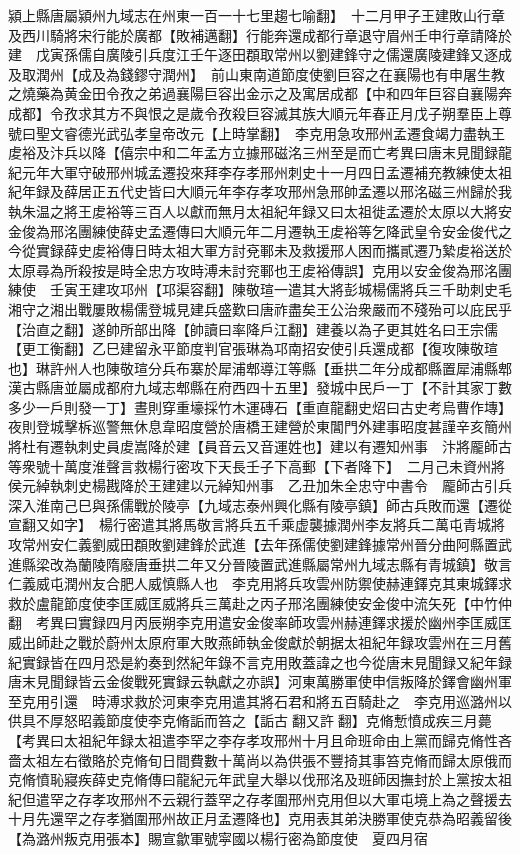潁上縣唐屬潁州九域志在州東一百一十七里趨七喻翻】　十二月甲子王建敗山行章及西川騎將宋行能於廣都【敗補邁翻】行能奔還成都行章退守眉州壬申行章請降於建　戊寅孫儒自廣陵引兵度江壬午逐田頵取常州以劉建鋒守之儒還廣陵建鋒又逐成及取潤州【成及為錢鏐守潤州】　前山東南道節度使劉巨容之在襄陽也有申屠生教之燒藥為黄金田令孜之弟過襄陽巨容出金示之及寓居成都【中和四年巨容自襄陽奔成都】令孜求其方不與恨之是歲令孜殺巨容滅其族大順元年春正月戊子朔羣臣上尊號曰聖文睿德光武弘孝皇帝改元【上時掌翻】　李克用急攻邢州孟遷食竭力盡執王䖍裕及汴兵以降【僖宗中和二年孟方立據邢磁洺三州至是而亡考異曰唐末見聞録龍紀元年大軍守破邢州城孟遷投來拜李存孝邢州刺史十一月四日孟遷補充教練使太祖紀年録及薛居正五代史皆曰大順元年李存孝攻邢州急邢帥孟遷以邢洺磁三州歸於我執朱温之將王䖍裕等三百人以獻而無月太祖紀年録又曰太祖徙孟遷於太原以大將安金俊為邢洺團練使薛史孟遷傳曰大順元年二月遷執王䖍裕等乞降武皇令安金俊代之今從實録薛史䖍裕傳日時太祖大軍方討兗鄆未及救援邢人困而攜貳遷乃縶䖍裕送於太原尋為所殺按是時全忠方攻時溥未討兖鄆也王䖍裕傳誤】克用以安金俊為邢洺團練使　壬寅王建攻邛州【邛渠容翻】陳敬瑄一遣其大將彭城楊儒將兵三千助刺史毛湘守之湘出戰屢敗楊儒登城見建兵盛歎曰唐祚盡矣王公治衆嚴而不殘殆可以庇民乎【治直之翻】遂帥所部出降【帥讀曰率降戶江翻】建養以為子更其姓名曰王宗儒【更工衡翻】乙巳建留永平節度判官張琳為邛南招安使引兵還成都【復攻陳敬瑄也】琳許州人也陳敬瑄分兵布寨於犀浦郫導江等縣【垂拱二年分成都縣置犀浦縣郫漢古縣唐並屬成都府九域志郫縣在府西四十五里】發城中民戶一丁【不計其家丁數多少一戶則發一丁】晝則穿重壕採竹木運磚石【重直龍翻史炤曰古史考烏曹作塼】夜則登城擊柝巡警無休息韋昭度營於唐橋王建營於東閶門外建事昭度甚謹辛亥簡州將杜有遷執刺史員䖍嵩降於建【員音云又音運姓也】建以有遷知州事　汴將龎師古等衆號十萬度淮聲言救楊行密攻下天長壬子下高郵【下者降下】　二月己未資州將侯元綽執刺史楊戡降於王建建以元綽知州事　乙丑加朱全忠守中書令　龎師古引兵深入淮南己巳與孫儒戰於陵亭【九域志泰州興化縣有陵亭鎮】師古兵敗而還【遷從宣翻又如字】　楊行密遣其將馬敬言將兵五千乘虚襲據潤州李友將兵二萬屯青城將攻常州安仁義劉威田頵敗劉建鋒於武進【去年孫儒使劉建鋒據常州晉分曲阿縣置武進縣梁改為蘭陵隋廢唐垂拱二年又分晉陵置武進縣屬常州九域志縣有青城鎮】敬言仁義威屯潤州友合肥人威慎縣人也　李克用將兵攻雲州防禦使赫連鐸克其東城鐸求救於盧龍節度使李匡威匡威將兵三萬赴之丙子邢洺團練使安金俊中流矢死【中竹仲翻　考異曰實録四月丙辰朔李克用遣安金俊率師攻雲州赫連鐸求援於幽州李匡威匡威出師赴之戰於蔚州太原府軍大敗燕師執金俊獻於朝据太祖紀年録攻雲州在三月舊紀實録皆在四月恐是約奏到然紀年錄不言克用敗蓋諱之也今從唐末見聞録又紀年録唐末見聞録皆云金俊戰死實録云執獻之亦誤】河東萬勝軍使申信叛降於鐸會幽州軍至克用引還　時溥求救於河東李克用遣其將石君和將五百騎赴之　李克用巡潞州以供具不厚怒昭義節度使李克脩詬而笞之【詬古翻又許翻】克脩慙憤成疾三月薨　【考異曰太祖紀年録太祖遣李罕之李存孝攻邢州十月且命班命由上黨而歸克脩性吝嗇太祖左右徵賂於克脩旬日間費數十萬尚以為供張不豐掎其事笞克脩而歸太原俄而克脩憤恥寢疾薛史克脩傳曰龍紀元年武皇大舉以伐邢洺及班師因撫封於上黨按太祖紀但遣罕之存孝攻邢州不云親行蓋罕之存孝圍邢州克用但以大軍屯境上為之聲援去十月先還罕之存孝猶圍邢州故正月孟遷降也】克用表其弟決勝軍使克恭為昭義留後【為潞州叛克用張本】賜宣歙軍號寜國以楊行密為節度使　夏四月宿


